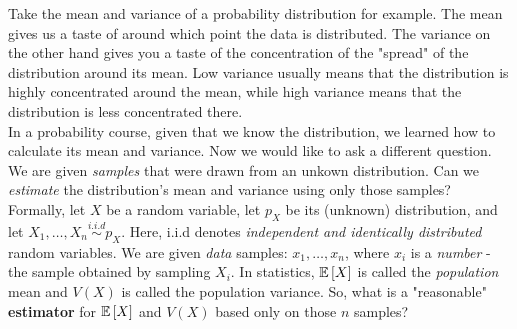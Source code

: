 Take the mean and variance of a probability distribution for example. 
The mean gives us a taste of around which point the data is distributed. The variance on the other hand gives you a taste of the concentration of the "spread" of the distribution around its mean. 
Low variance usually means that the distribution is highly concentrated around the mean, while high variance means that the distribution is less concentrated there.\\
In a probability course, given that we know the distribution, we learned how to calculate its mean and variance. 
Now we would like to ask a different question. We are given {\em samples} that were drawn from an unkown distribution.
Can we {\em estimate}  the distribution's mean and variance using only those samples?\\

Formally, let $X$ be a random variable, let $p_X$ be its (unknown) distribution, and let $X_1,\ldots,X_n\overset{i.i.d}{\sim} p_X$.
Here, i.i.d  denotes \emph{independent and identically distributed} random variables. We are given \emph{data}
samples: $x_1,\ldots,x_n$, where $x_i$ is a {\em number} - the sample obtained by sampling $X_i$.
In statistics, $\mathbb{E}\,[X]$ is called the {\em population} mean and  $V(X)$ is called the population variance. 
So, what is a "reasonable" \textbf{estimator} for $\mathbb{E}\,[X]$ and $V(X)$ based only on those $n$ samples?\\


